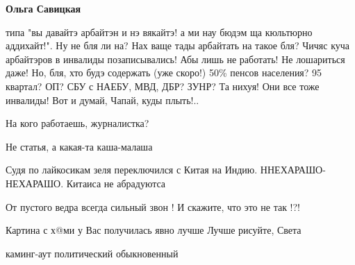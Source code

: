 \begin{itemize}
\begin{itemize}
\textbf{Ольга Савицкая} 

типа "вы давайтэ арбайтэн и нэ вякайтэ! а ми нау бюдэм ща кюльтюрно аддихайт!".
Ну не бля ли на? Нах ваще тады арбайтать на такое бля? Чичяс куча арбайтэров в
инвалиды позаписывались! Абы лишь не работать! Не лошариться даже! Но, бля, хто
будэ содержать (уже скоро!) 50\% пенсов населения? 95 квартал? ОП? СБУ с НАЕБУ,
МВД, ДБР? ЗУНР? Та нихуя! Они все тоже инвалиды! Вот и думай, Чапай, куды
плыть!..

\end{itemize}

 
На кого работаешь, журналистка?

 
Не статья, а какая-та каша-малаша

 
Судя по лайкосикам зеля переключился с Китая на Индию. ННЕХАРАШО-НЕХАРАШО. Китаиса не абрадуютса👹👹👹

 
От пустого ведра всегда сильный звон ! И скажите, что это не так !?!

 
Картина с х@ми у Вас получилась явно лучше
Лучше рисуйте, Света

 
каминг-аут политический обыкновенный


\end{itemize}
